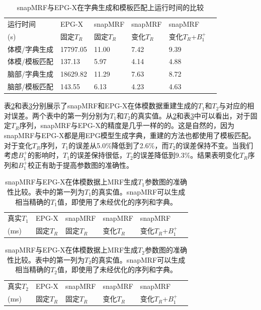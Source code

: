 \begin{table}
\caption{snapMRF与EPG-X在字典生成和模板匹配上运行时间的比较}
\centering
\label{tab:time}
\begin{tabular}{|l|l|l|l|l|l|}
\hline
\hline
运行时间 & EPG-X & snapMRF & snapMRF & snapMRF\\ 
(s) & 固定$T_R$ & 固定$T_R$ & 变化$T_R$ & 变化$T_R$+$B_1^+$\\
\hline
体模/字典生成 & 17797.05 & 11.00 & 7.42 & 9.39 \\
\hline
体模/模板匹配 & 137.13 & 5.97 & 4.14 & 4.88\\
\hline
脑部/字典生成 & 18629.82 & 11.29 & 7.63 & 8.72 \\
\hline
脑部/模板匹配 & 143.55 & 6.13 & 4.23 & 4.63 \\
\hline
\end{tabular}
\end{table}

表\ref{tab:t1}和表\ref{tab:t2}分别展示了snapMRF和EPG-X在体模数据重建生成的$T_1$和$T_2$与对应的相对误差。两个表中的第一列分别为$T_1$和$T_2$的真实值。从\ref{tab:t1}和表\ref{tab:t2}中可以看出，对于固定$T_R$序列，snapMRF与EPG-X的精度是几乎一样的的。这是自然的，因为snapMRF与EPG-X都是用EPG模型生成字典，重建的方法也都使用了模板匹配。对于变化$T_R$序列，$T_1$的误差从5.0\%降低到了2.6\%，而$T_2$的误差保持不变。当我们考虑$B_1^+$的影响时，$T_1$的误差保持很低，$T_2$的误差降低到9.3\%。结果表明变化$T_R$序列和$B_1^+$校正有助于提高参数图的准确性。

\begin{table}
\caption{snapMRF与EPG-X在体模数据上MRF生成$T_1$参数图的准确性比较。表中的第一列为$T_1$的真实值。snapMRF可以生成相当精确的$T_1$值，即使用了未经优化的序列和字典。}
\centering
\label{tab:t1}
\begin{tabular}{|l|l|l|l|l|l|}
\hline
\hline
真实$T_1$ & EPG-X & snapMRF & snapMRF & snapMRF\\ 
(ms) & 固定$T_R$ & 固定$T_R$ & 变化$T_R$ & 变化$T_R$+$B_1^+$\\
\hline
 
\hline
\end{tabular}
\end{table}

\begin{table}
\caption{snapMRF与EPG-X在体模数据上MRF生成$T_2$参数图的准确性比较。表中的第一列为$T_2$的真实值。snapMRF可以生成相当精确的$T_2$值，即使用了未经优化的序列和字典。}
\centering
\label{tab:t2}
\begin{tabular}{|l|l|l|l|l|l|}
\hline
\hline
真实$T_2$ & EPG-X & snapMRF & snapMRF & snapMRF\\ 
(ms) & 固定$T_R$ & 固定$T_R$ & 变化$T_R$ & 变化$T_R$+$B_1^+$\\
\hline

\hline
\end{tabular}
\end{table}

